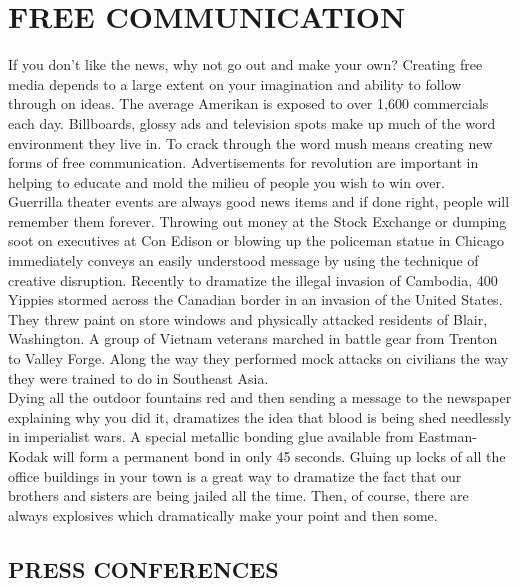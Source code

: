 \documentclass[11pt,twoside,a4paper]{book}
\begin{document}
\section{FREE COMMUNICATION}

If you don't like the news, why not go out and make your own? Creating free media depends to a large extent on your imagination and ability to follow through on ideas. The average Amerikan is exposed to over 1,600 commercials each day. Billboards, glossy ads and television spots make up much of the word environment they live in. To crack through the word mush means creating new forms of free communication. Advertisements for revolution are important in helping to educate and mold the milieu of people you wish to win over.~\\

Guerrilla theater events are always good news items and if done right, people will remember them forever. Throwing out money at the Stock Exchange or dumping soot on executives at Con Edison or blowing up the policeman statue in Chicago immediately conveys an easily understood message by using the technique of creative disruption. Recently to dramatize the illegal invasion of Cambodia, 400 Yippies stormed across the Canadian border in an invasion of the United States. They threw paint on store windows and physically attacked residents of Blair, Washington. A group of Vietnam veterans marched in battle gear from Trenton to Valley Forge. Along the way they performed mock attacks on civilians the way they were trained to do in Southeast Asia.~\\

Dying all the outdoor fountains red and then sending a message to the newspaper explaining why you did it, dramatizes the idea that blood is being shed needlessly in imperialist wars. A special metallic bonding glue available from Eastman-Kodak will form a permanent bond in only 45 seconds. Gluing up locks of all the office buildings in your town is a great way to dramatize the fact that our brothers and sisters are being jailed all the time. Then, of course, there are always explosives which dramatically make your point and then some.

\subsection{PRESS CONFERENCES}
\end{document}
